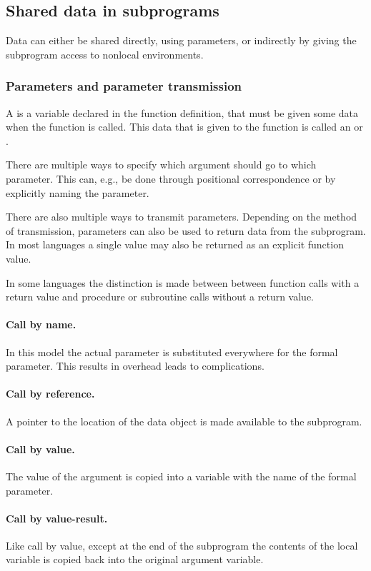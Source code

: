 \subsection{Shared data in subprograms}
Data can either be shared directly, using parameters, or indirectly by giving the subprogram access to nonlocal environments.

\subsubsection{Parameters and parameter transmission}
A  is a variable declared in the function definition, that must be given some data when the function is called. This data that is given to the function is called an  or .

There are multiple ways to specify which argument should go to which parameter. This can, e.g., be done through positional correspondence or by explicitly naming the parameter.

There are also multiple ways to transmit parameters. Depending on the method of transmission, parameters can also be used to return data from the subprogram. In most languages a single value may also be returned as an explicit function value.

In some languages the distinction is made between between function calls with a return value and procedure or subroutine calls without a return value.

\paragraph{Call by name.} In this model the actual parameter is substituted everywhere for the formal parameter. This results in overhead leads to complications.
\paragraph{Call by reference.} A pointer to the location of the data object is made available to the subprogram.
\paragraph{Call by value.} The value of the argument is copied into a variable with the name of the formal parameter.
\paragraph{Call by value-result.} Like call by value, except at the end of the subprogram the contents of the local variable is copied back into the original argument variable.
